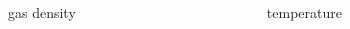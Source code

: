 \documentclass{beamer}
\begin{document}
\begin{frame}
\begin{columns}
\begin{column}[]{6.0cm}
    {\footnotesize{gas density}}
      \end{column}
      \begin{column}[]{6.0cm}

      {\footnotesize{temperature}}
      \end{column}
    \end{columns}
      \vspace{0.5cm}
    \end{frame}
\end{document}
